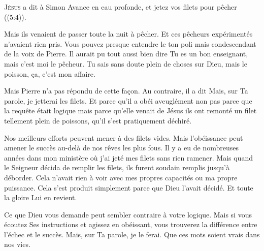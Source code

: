 \jrnlmonth





\lettrine{J}{ésus} a dit à Simon\frcolon{}
 \Og Avance en eau profonde, et jetez vos filets pour pêcher \Fg{}
 ((5:4)).

Mais ils venaient de passer toute la nuit à pêcher.
 Et ces pêcheurs expérimentés n'avaient rien pris.
 Vous pouvez presque entendre le ton poli mais condescendant
 de la voix de Pierre. Il aurait pu tout aussi bien dire\frcolon{} 
 \Og Tu es un bon enseignant, mais c'est moi le pêcheur.
 Tu sais sans doute plein de choses sur Dieu, mais le poisson,
 \c{c}a, c'est mon affaire. \Fg{}


Mais Pierre n'a pas répondu de cette fa\c{c}on.
 Au contraire, il a dit\frcolon{} 
 \Og Mais, sur Ta parole, je jetterai les filets. \Fg{}
 Et parce qu'il a obéi aveuglément \ocadr non pas parce que la requête était
 logique mais parce qu'elle venait de Jésus \fcadr{}
 ils ont remonté un filet tellement plein de poissons,
 qu'il s'est pratiquement déchiré.

Nos meilleurs efforts peuvent mener à des filets vides.
 Mais l'obéissance peut amener le succès au-delà de nos rêves les plus fous.
 Il y a eu de nombreuses années dans mon ministère où j'ai jeté mes filets
 sans rien ramener. Mais quand le Seigneur décida de remplir les filets,
 ils furent soudain remplis jusqu'à déborder.
 Cela n'avait rien à voir avec mes propres capacités ou ma propre puissance.
 Cela s'est produit simplement parce que Dieu l'avait décidé.
 Et toute la gloire Lui en revient.

Ce que Dieu vous demande peut sembler contraire à votre logique.
 Mais si vous écoutez Ses instructions et agissez en obéissant,
 vous trouverez la différence entre l'échec et le succès.
 \Og Mais, sur Ta parole, je le ferai. \Fg{}
 Que ces mots soient vrais dans nos vies.

\dvrule

